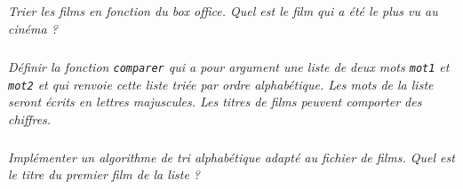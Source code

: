 \documentclass[10pt,fleqn]{article} %
\begin{document}
\begin{multicols}{2}
\subparagraph{}
\textit{Trier les films en fonction du box office. Quel est le film qui a été le plus vu au cinéma ?}

\subparagraph{}
\textit{Définir la fonction \texttt{comparer} qui a pour argument une liste de deux mots \texttt{mot1} et \texttt{mot2} et qui renvoie cette liste triée par ordre alphabétique. Les mots de la liste seront écrits en lettres majuscules. Les titres de films peuvent comporter des chiffres.}

\subparagraph{}
\textit{Implémenter un algorithme de tri alphabétique adapté au fichier de films. Quel est le titre du premier film de la liste ?}



%
%
%
%


\end{multicols}
\end{document}
